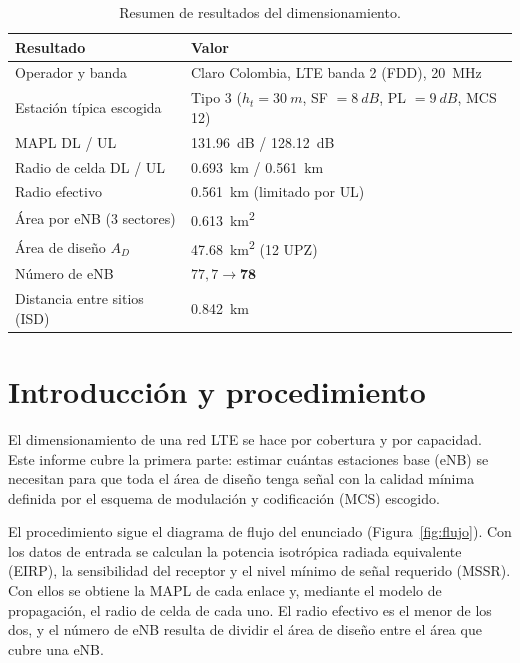 \documentclass[11pt,letterpaper]{article}
\begin{document}
\begin{table}[H]
\centering
\caption{Resumen de resultados del dimensionamiento.}
\label{tab:resumen}
\begin{tabular}{@{}ll@{}}
\toprule
\textbf{Resultado} & \textbf{Valor} \\
\midrule
Operador y banda & Claro Colombia, LTE banda 2 (FDD), \SI{20}{MHz} \\
Estación típica escogida & Tipo 3 ($h_t=\SI{30}{m}$, SF $=\SI{8}{dB}$, PL $=\SI{9}{dB}$, MCS 12) \\
MAPL DL / UL & \SI{131.96}{dB} / \SI{128.12}{dB} \\
Radio de celda DL / UL & \SI{0.693}{km} / \SI{0.561}{km} \\
Radio efectivo & \SI{0.561}{km} (limitado por UL) \\
Área por eNB (3 sectores) & \SI{0.613}{km^2} \\
Área de diseño $A_D$ & \SI{47.68}{km^2} (12 UPZ) \\
Número de eNB & $77{,}7 \rightarrow \mathbf{78}$ \\
Distancia entre sitios (ISD) & \SI{0.842}{km} \\
\bottomrule
\end{tabular}
\end{table}

\vspace{0.3cm}
{\small\tableofcontents}
\newpage

\section{Introducción y procedimiento}

El dimensionamiento de una red LTE se hace por cobertura y por capacidad. Este informe cubre la primera parte: estimar cuántas estaciones base (eNB) se necesitan para que toda el área de diseño tenga señal con la calidad mínima definida por el esquema de modulación y codificación (MCS) escogido.

El procedimiento sigue el diagrama de flujo del enunciado (Figura~\ref{fig:flujo}). Con los datos de entrada se calculan la potencia isotrópica radiada equivalente (EIRP), la sensibilidad del receptor y el nivel mínimo de señal requerido (MSSR). Con ellos se obtiene la MAPL de cada enlace y, mediante el modelo de propagación, el radio de celda de cada uno. El radio efectivo es el menor de los dos, y el número de eNB resulta de dividir el área de diseño entre el área que cubre una eNB.
\end{document}
